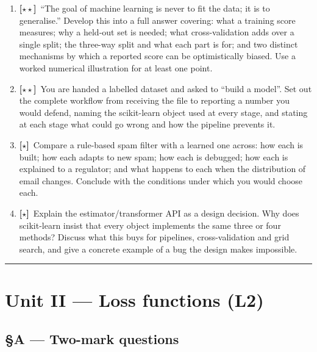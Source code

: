 \documentclass[11pt,a4paper]{article}
\newcommand{\LB}{{\footnotesize\textbf{[$\star\star$]}}}
\newcommand{\LC}{{\footnotesize\textbf{[$\star$]}}}
\newcommand{\Q}[1]{\item[\textbf{#1}]}
\begin{document}
\begin{enumerate}[leftmargin=2.2cm]
\Q{U1.21}\LB\ ``The goal of machine learning is never to fit the data; it is to
  generalise.'' Develop this into a full answer covering: what a training score
  measures; why a held-out set is needed; what cross-validation adds over a
  single split; the three-way split and what each part is for; and two distinct
  mechanisms by which a reported score can be optimistically biased. Use a
  worked numerical illustration for at least one point.
\Q{U1.22}\LB\ You are handed a labelled dataset and asked to ``build a model''.
  Set out the complete workflow from receiving the file to reporting a number
  you would defend, naming the scikit-learn object used at every stage, and
  stating at each stage what could go wrong and how the pipeline prevents it.
\Q{U1.23}\LC\ Compare a rule-based spam filter with a learned one across:
  how each is built; how each adapts to new spam; how each is debugged; how
  each is explained to a regulator; and what happens to each when the
  distribution of email changes. Conclude with the conditions under which you
  would choose each.
\Q{U1.24}\LC\ Explain the estimator/transformer API as a design decision.
  Why does scikit-learn insist that every object implements the same three or
  four methods? Discuss what this buys for pipelines, cross-validation and grid
  search, and give a concrete example of a bug the design makes impossible.
\end{enumerate}

\vspace{0.4em}\hrule

\section*{Unit II --- Loss functions \quad (L2)}

\subsection*{§A --- Two-mark questions}
\end{document}
